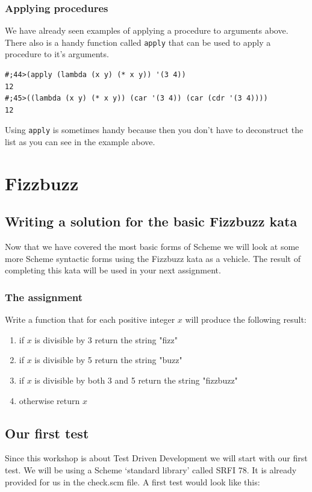 \documentclass[12pt,a4paper,english,twoside]{article}
\begin{document}
\subsubsection{Applying procedures}
We have already seen examples of applying a procedure to arguments above. 
There also is a handy function called \texttt{apply} that can be used to apply 
a procedure to it's arguments.
\begin{lstlisting}
#;44>(apply (lambda (x y) (* x y)) '(3 4))
12
#;45>((lambda (x y) (* x y)) (car '(3 4)) (car (cdr '(3 4))))
12
\end{lstlisting} Using \texttt{apply} is sometimes handy because then you 
don't have to deconstruct the list as you can see in the example above.
\section{Fizzbuzz}
\subsection{Writing a solution for the basic Fizzbuzz kata}
Now that we have covered the most basic forms of Scheme we will look at some 
more Scheme syntactic forms using the Fizzbuzz kata as a vehicle. The result 
of completing this kata will be used in your next assignment.
\subsubsection{The assignment}
Write a function that for each positive integer $x$ will produce the following 
result:
\begin{enumerate}
  \item if $x$ is divisible by 3 return the string "fizz"
  \item if $x$ is divisible by 5 return the string "buzz"
  \item if $x$ is divisible by both 3 and 5 return the string "fizzbuzz"
  \item otherwise return $x$
\end{enumerate}
\subsection{Our first test}
Since this workshop is about Test Driven Development we will start with our 
first test. We will be using a Scheme `standard library' called SRFI 78. It is 
already provided for us in the check.scm file. A first test would look like 
this:
\end{document}

